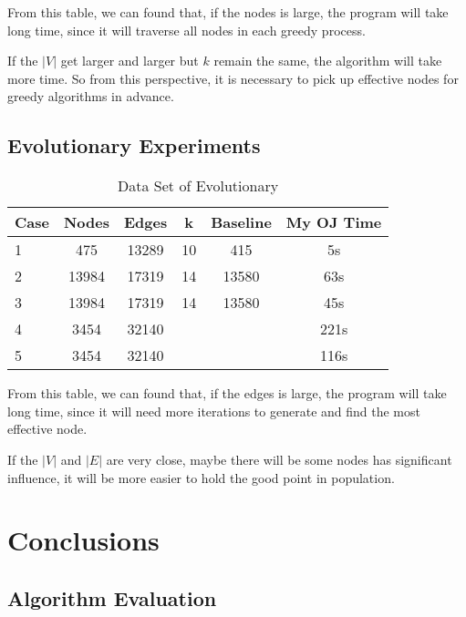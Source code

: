 \documentclass{article}
\begin{document}
From this table, we can found that, if the nodes is large, the program will take long time, since it will traverse all nodes in each greedy process.

If the $|V|$ get larger and larger but $k$ remain the same, the algorithm will take more time. So from this perspective, it is necessary to pick up effective nodes for greedy algorithms in advance.

\subsection{Evolutionary Experiments}

\begin{table}[!ht]
\centering
\caption{Data Set of Evolutionary}
\begin{tabular}{|l|c|c|c|c|c|} \hline
Case & Nodes & Edges & k & Baseline & My OJ Time  \\ \hline
1 & 475 & 13289 & 10 & 415 & 5s \\ \hline
2 &	13984 &	17319 & 14 & 13580  & 63s \\ \hline
3 & 13984 & 17319 & 14 & 13580  & 45s \\ \hline
4 & 3454 & 32140 & & & 221s \\ \hline
5 & 3454 & 32140 & & & 116s \\ \hline
\end{tabular}
\end{table}

From this table, we can found that, if the edges is large, the program will take long time, since it will need more iterations to generate and find the most effective node.

If the $|V|$ and $|E|$ are very close, maybe there will be some nodes has significant influence, it will be more easier to hold the good point in population.


\section{Conclusions}

\subsection{Algorithm Evaluation}
\end{document}
